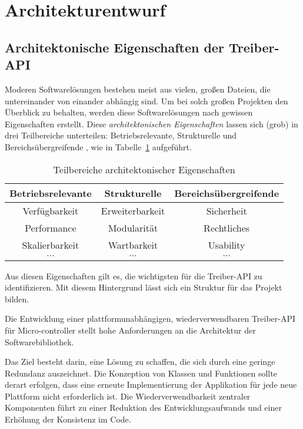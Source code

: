 \section{Architekturentwurf}

\label{sec:architecture_properties}
\subsection{Architektonische Eigenschaften der Treiber-API}
Moderen Softwarelösungen bestehen meist aus vielen, großen Dateien, die untereinander von einander abhängig sind.
Um bei solch großen Projekten den Überblick zu behalten, werden diese Softwarelösungen nach gewissen Eigenschaften erstellt.
Diese \emph{architektonischen Eigenschaften} lassen sich (grob) in drei Teilbereiche unterteilen: Betriebsrelevante, Strukturelle und Bereichsübergreifende \cite{barlik_architektur}, wie in Tabelle~\ref{tab:architektonische_eigenschaften} aufgeführt. %

\begin{table}[H]
	\begin{center}
		\begin{tabular}{ c | c | c }
			\textbf{Betriebsrelevante} & \textbf{Strukturelle} & \textbf{Bereichsübergreifende}\\
			\hline
			Verfügbarkeit & Erweiterbarkeit & Sicherheit\\
			Performance & Modularität & Rechtliches\\
			Skalierbarkeit & Wartbarkeit & Usability\\
			$\cdots$ & $\cdots$ & $\cdots$\\
		\end{tabular}
		\caption{Teilbereiche architektonischer Eigenschaften}
	    \label{tab:architektonische_eigenschaften}
	\end{center}
\end{table}

Aus diesen Eigenschaften gilt es, die wichtigsten für die Treiber-API zu identifizieren. 
Mit diesem Hintergrund lässt sich ein Struktur für das Projekt bilden.

Die Entwicklung einer plattformunabhängigen, wiederverwendbaren Treiber-API für Micro-controller stellt hohe Anforderungen an die Architektur der Softwarebibliothek.

Das Ziel besteht darin, eine Lösung zu schaffen, die sich durch eine geringe Redundanz auszeichnet. 
Die Konzeption von Klassen und Funktionen sollte derart erfolgen, dass eine erneute Implementierung der Applikation für jede neue Plattform nicht erforderlich ist.
Die Wiederverwendbarkeit zentraler Komponenten führt zu einer Reduktion des Entwicklungsaufwands und einer Erhöhung der Konsistenz im Code.

